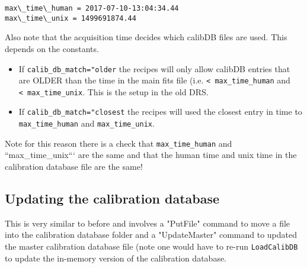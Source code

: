 \documentclass[11pt]{article}
\begin{document}
    \begin{Verbatim}[commandchars=\\\{\}]
max\_time\_human = 2017-07-10-13:04:34.44
max\_time\_unix = 1499691874.44

    \end{Verbatim}

    Also note that the acquisition time decides which calibDB files are
used. This depends on the constants.

\begin{itemize}
\item
  If \texttt{calib\_db\_match="older} the recipes will only allow
  calibDB entries that are OLDER than the time in the main fits file
  (i.e. \texttt{\textless{}\ max\_time\_human} and
  \texttt{\textless{}\ max\_time\_unix}. This is the setup in the old
  DRS.
\item
  If \texttt{calib\_db\_match="closest} the recipes will used the
  closest entry in time to \texttt{max\_time\_human} and
  \texttt{max\_time\_unix}.
\end{itemize}

Note for this reason there is a check that \texttt{max\_time\_human} and
``max\_time\_unix``` are the same and that the human time and unix time
in the calibration database file are the same!

    \subsection{Updating the calibration
database}\label{updating-the-calibration-database}

This is very similar to before and involves a "PutFile" command to move
a file into the calibration database folder and a "UpdateMaster" command
to updated the master calibration database file (note one would have to
re-run \texttt{LoadCalibDB} to update the in-memory version of the
calibration database.
\end{document}
